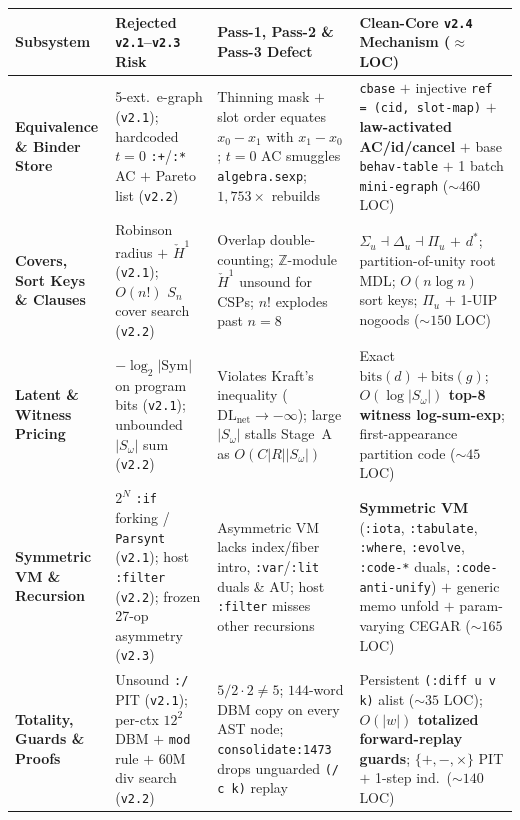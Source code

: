 \documentclass[12pt]{article}
\begin{document}
\begin{table}[htbp]
\centering
\footnotesize
\setlength{\tabcolsep}{4pt}
\begin{tabular}{@{}L{2.25cm}L{3.75cm}L{4.7cm}L{4.9cm}@{}}
\toprule
\textbf{Subsystem} & \textbf{Rejected \texttt{v2.1}--\texttt{v2.3} Risk} & \textbf{Pass-1, Pass-2 \& Pass-3 Defect} & \textbf{Clean-Core \texttt{v2.4} Mechanism ($\approx$ LOC)} \\
\midrule
\textbf{Equivalence \& Binder Store} & 5-ext.\ e-graph (\texttt{v2.1}); hardcoded $t=0$ \texttt{:+}/\texttt{:*} AC $+$ Pareto list (\texttt{v2.2}) & Thinning mask $+$ slot order equates $x_0-x_1$ with $x_1-x_0$; $t=0$ AC smuggles \texttt{algebra.sexp}; $1,753\times$ rebuilds & \texttt{cbase} $+$ injective \texttt{ref = (cid, slot-map)} $+$ \textbf{law-activated AC/id/cancel} $+$ base \texttt{behav-table} $+$ 1 batch \texttt{mini-egraph} ($\sim 460$ LOC) \\
\addlinespace[2pt]
\textbf{Covers, Sort Keys \& Clauses} & Robinson radius $+$ $\check{H}^1$ (\texttt{v2.1}); $O(n!)$ $S_n$ cover search (\texttt{v2.2}) & Overlap double-counting; $\mathbb{Z}$-module $\check{H}^1$ unsound for CSPs; $n!$ explodes past $n=8$ & $\Sigma_u \dashv \Delta_u \dashv \Pi_u$ $+$ $d^*$; partition-of-unity root MDL; $O(n\log n)$ sort keys; $\Pi_u$ $+$ 1-UIP nogoods ($\sim 150$ LOC) \\
\addlinespace[2pt]
\textbf{Latent \& Witness Pricing} & $-\log_2|\mathrm{Sym}|$ on program bits (\texttt{v2.1}); unbounded $|S_\omega|$ sum (\texttt{v2.2}) & Violates Kraft's inequality ($\mathrm{DL}_{\mathrm{net}}\to -\infty$); large $|S_\omega|$ stalls Stage~A as $O(C|R||S_\omega|)$ & Exact $\mathrm{bits}(d)+\mathrm{bits}(g)$; \textbf{$O(\log|S_\omega|)$ top-8 witness log-sum-exp}; first-appearance partition code ($\sim 45$ LOC) \\
\addlinespace[2pt]
\textbf{Symmetric VM \& Recursion} & $2^N$ \texttt{:if} forking / \texttt{Parsynt} (\texttt{v2.1}); host \texttt{:filter} (\texttt{v2.2}); frozen 27-op asymmetry (\texttt{v2.3}) & Asymmetric VM lacks index/fiber intro, \texttt{:var}/\texttt{:lit} duals \& AU; host \texttt{:filter} misses other recursions & \textbf{Symmetric VM} (\texttt{:iota}, \texttt{:tabulate}, \texttt{:where}, \texttt{:evolve}, \texttt{:code-*} duals, \texttt{:code-anti-unify}) $+$ generic memo unfold $+$ param-varying CEGAR ($\sim 165$ LOC) \\
\addlinespace[2pt]
\textbf{Totality, Guards \& Proofs} & Unsound \texttt{:/} PIT (\texttt{v2.1}); per-ctx $12^2$ DBM $+$ \texttt{mod} rule $+$ $60\mathrm{M}$ div search (\texttt{v2.2}) & $5/2\cdot 2\ne 5$; $144$-word DBM copy on every AST node; \texttt{consolidate:1473} drops unguarded \texttt{(/ c k)} replay & Persistent \texttt{(:diff u v k)} alist ($\sim 35$ LOC); \textbf{$O(|w|)$ totalized forward-replay guards}; $\{+,-,\times\}$ PIT $+$ 1-step ind.\ ($\sim 140$ LOC) \\

\end{tabular}
\end{table}
\end{document}
